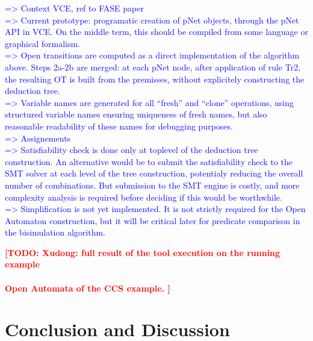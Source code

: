 \documentclass{lncs/llncs}
\newcommand{\TODO}[1]{\textcolor{red}{\textbf{[TODO:#1]}}}
\newcommand{\ERIC}[1]{\textcolor{blue}{#1}}
\begin{document}
\ERIC{
=> Context VCE, ref to FASE paper\\
=> Current prototype: programatic creation of pNet objects, through the pNet API in VCE. On the middle term, this should be compiled from some language or graphical formalism.\\
=> Open transitions are computed as a direct implementation of the algorithm above. Steps 2a-2b are merged: at each pNet node, after application of rule Tr2, the resulting OT is built from the premisses, without explicitely constructing the deduction tree. \\
=> Variable names are generated for all ``fresh'' and ``clone''
operations, using structured variable names ensuring uniqueness of
fresh names, but also reasonable readability of these names for
debugging purposes.\\
=> Assignements\\
=> Satisfiability check is done only at toplevel of the deduction tree construction. An alternative would be to submit the satisfiability check to the SMT solver at each level of the tree construction, potentialy reducing the overall number of combinations. But submission to the SMT engine is costly, and more complexity analysis is required before deciding if this would be worthwhile.\\
=> Simplification is not yet implemented. It is not strictly required for the Open Automaton construction, but it will be critical later for predicate comparison in the bisimulation algorithm.}


\TODO{
Xudong: full result of the tool execution on the running example\\\\
Open Automata of the CCS example.
}




\section{Conclusion and Discussion}
\label{section:conclusion}


  



% 


\end{document}
